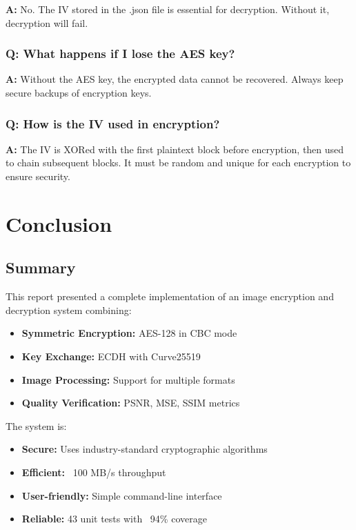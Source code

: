 \documentclass[12pt,a4paper]{report}
\begin{document}
\textbf{A:} No. The IV stored in the .json file is essential for decryption. Without it, decryption will fail.

\subsection{Q: What happens if I lose the AES key?}

\textbf{A:} Without the AES key, the encrypted data cannot be recovered. Always keep secure backups of encryption keys.

\subsection{Q: How is the IV used in encryption?}

\textbf{A:} The IV is XORed with the first plaintext block before encryption, then used to chain subsequent blocks. It must be random and unique for each encryption to ensure security.

\chapter{Conclusion}

\section{Summary}

This report presented a complete implementation of an image encryption and decryption system combining:

\begin{itemize}
    \item \textbf{Symmetric Encryption:} AES-128 in CBC mode
    \item \textbf{Key Exchange:} ECDH with Curve25519
    \item \textbf{Image Processing:} Support for multiple formats
    \item \textbf{Quality Verification:} PSNR, MSE, SSIM metrics
\end{itemize}

The system is:
\begin{itemize}
    \item \textbf{Secure:} Uses industry-standard cryptographic algorithms
    \item \textbf{Efficient:} ~100 MB/s throughput
    \item \textbf{User-friendly:} Simple command-line interface
    \item \textbf{Reliable:} 43 unit tests with ~94\% coverage
\end{itemize}
\end{document}
